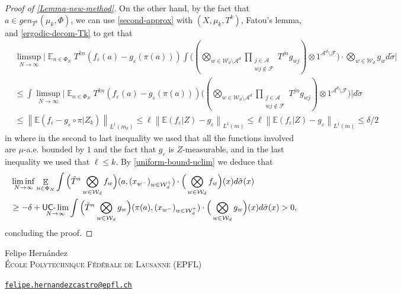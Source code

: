 \documentclass[letter,11pt]{article}
\theoremstyle{definition}
\newcommand{\E}{\mathbb{E}}
\newcommand{\sF}{\mathcal{F}}
\newcommand{\sA}{\mathcal{A}}
\newcommand{\bE}{\mathop{\mathbb{E}}}
\newcommand{\norm}[1]{\left\lVert#1\right\rVert}
\newcommand{\uclim}{\mathop{\textup{\textsf{UC-}}\lim}}
\begin{document}
\begin{proof}[Proof of \cref{Lemma-new-method}]
On the other hand, by the fact that $a\in gen_{T^k}(\mu_k,\Phi)$, we can use \cref{second-approx} with $(X,\mu_k,T^k)$, Fatou's lemma, and \cref{ergodic-decom-Tk} to get that  
\begin{align*}
    & \limsup_{N\to \infty} \Big|  \bE_{n\in \Phi_N}  T^{kn} (f_\varepsilon(a)-g_\varepsilon(\pi(a)))  \int  \Big( (\bigotimes_{w\in \mathcal{W}_{d}\setminus\sA^d}  \prod_{\substack{j\in \sA\\ wj\notin\sF}}T^{jn}g_{wj} )\otimes 1^{\sA^d\setminus \sF} \Big) \cdot  \bigotimes_{w\in \mathcal{W}_d}g_{w}d\tilde{\sigma}   \Big|\\
    &\leq \int  \limsup_{N\to \infty} \Big|  \bE_{n\in \Phi_N}  T^{kn} (f_\varepsilon(a)-g_\varepsilon(\pi(a)))  \Big( (\bigotimes_{w\in \mathcal{W}_{d}\setminus\sA^d}  \prod_{\substack{j\in \sA\\wj\notin \sF}}T^{jn}g_{wj} )\otimes 1^{\sA^d\setminus \sF} \Big)\Big| d\tilde{\sigma}    \\
    &\leq  \norm{\E(f_\varepsilon-g_\varepsilon\circ \pi | Z_k) }_{L^1(m_k)} \leq \ell\norm{\E(f_\varepsilon| Z)-g_\varepsilon }_{L^1(m)}  \leq  \ell\norm{\E(f_\varepsilon| Z)-g_\varepsilon }_{L^1(m)} \leq \delta/2
\end{align*}
in where in the second to last inequality we used that all the functions involved are $\mu$-a.e. bounded by $1$ and the fact that $g_\varepsilon$ is $Z$-measurable, and in the last inequality we used that $\ell\leq k$. By \cref{uniform-bound-uclim} we deduce that
\begin{align*}
    & \liminf_{N\to \infty}  \bE_{n\in \Phi_N}  \int    \Big(  \tilde{T}^n \bigotimes_{w\in \mathcal{W}_d} f_{w}\Big)(a, (x_{w^-})_{w\in \mathcal{W}_d^{+}} )\cdot \Big(\bigotimes_{w\in \mathcal{W}_d}f_{w}  \Big)(x) d\tilde{\sigma}(x)  \\
    &\geq -\delta+  \uclim_{N\to\infty}   \int     \Big(  \tilde{T}^n\bigotimes_{w\in \mathcal{W}_d} g_{w}\Big)(\pi(a), (x_{w^-})_{w\in \mathcal{W}_d^{+}} )\cdot \Big(\bigotimes_{w\in \mathcal{W}_d}g_{w}  \Big)(x) d\tilde{\sigma}(x)  >0,
\end{align*}
concluding the proof.
\end{proof}


\small{


}

\bigskip
\noindent
Felipe Hernández\\
\textsc{{\'E}cole Polytechnique F{\'e}d{\'e}rale de Lausanne} (EPFL)\par\nopagebreak
\noindent
\href{mailto:felipe.hernandezcastro@epfl.ch}
{\texttt{felipe.hernandezcastro@epfl.ch}}
\end{document}
